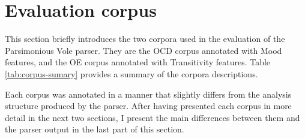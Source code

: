 \section{Evaluation corpus}
\label{sec:corpus}
    
    This section briefly introduces the two corpora used in the evaluation of the Parsimonious Vole parser. They are the OCD corpus annotated with Mood  features, and the OE corpus annotated with Transitivity features. Table \ref{tab:corpus-sumary} provides a summary of the corpora descriptions.  
    
    \begin{table}[!ht]
        \centering
        \caption{Evaluation corpus summary}
        \label{tab:corpus-sumary}
    \end{table}
    
    Each corpus was annotated in a manner that slightly differs from the analysis structure produced by the parser. After having presented each corpus in more detail in the next two sections, I present the main differences between them and the parser output in the last part of this section. 
    

